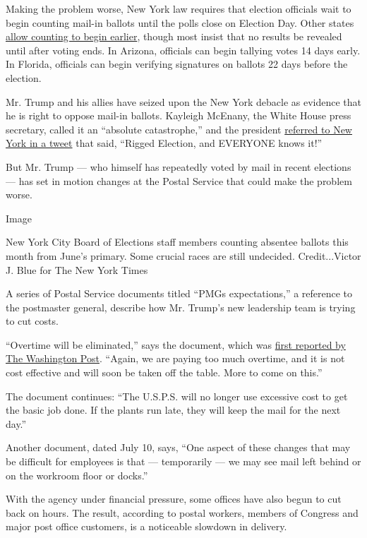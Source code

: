Making the problem worse, New York law requires that election officials
wait to begin counting mail-in ballots until the polls close on Election
Day. Other states
\href{https://www.ncsl.org/research/elections-and-campaigns/vopp-table-16-when-absentee-mail-ballot-processing-and-counting-can-begin.aspx}{allow
counting to begin earlier}, though most insist that no results be
revealed until after voting ends. In Arizona, officials can begin
tallying votes 14 days early. In Florida, officials can begin verifying
signatures on ballots 22 days before the election.

Mr. Trump and his allies have seized upon the New York debacle as
evidence that he is right to oppose mail-in ballots. Kayleigh McEnany,
the White House press secretary, called it an ``absolute catastrophe,''
and the president
\href{https://twitter.com/realDonaldTrump/status/1287554056727040008?s=20}{referred
to New York in a tweet} that said, ``Rigged Election, and EVERYONE knows
it!''

But Mr. Trump --- who himself has repeatedly voted by mail in recent
elections --- has set in motion changes at the Postal Service that could
make the problem worse.

Image

New York City Board of Elections staff members counting absentee ballots
this month from June's primary. Some crucial races are still undecided.
Credit...Victor J. Blue for The New York Times

A series of Postal Service documents titled ``PMGs expectations,'' a
reference to the postmaster general, describe how Mr. Trump's new
leadership team is trying to cut costs.

``Overtime will be eliminated,'' says the document, which was
\href{https://www.washingtonpost.com/business/2020/07/14/postal-service-trump-dejoy-delay-mail/}{first
reported by The Washington Post}. ``Again, we are paying too much
overtime, and it is not cost effective and will soon be taken off the
table. More to come on this.''

The document continues: ``The U.S.P.S. will no longer use excessive cost
to get the basic job done. If the plants run late, they will keep the
mail for the next day.''

Another document, dated July 10, says, ``One aspect of these changes
that may be difficult for employees is that --- temporarily --- we may
see mail left behind or on the workroom floor or docks.''

With the agency under financial pressure, some offices have also begun
to cut back on hours. The result, according to postal workers, members
of Congress and major post office customers, is a noticeable slowdown in
delivery.

